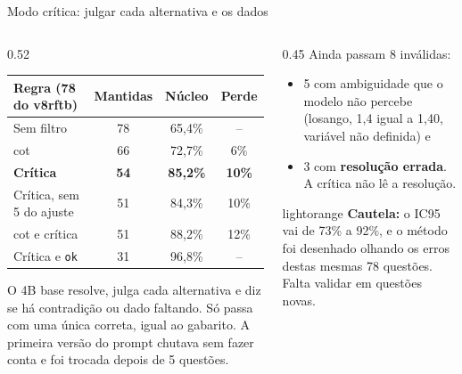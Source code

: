 \documentclass[aspectratio=169,11pt]{beamer}
\begin{document}
\begin{frame}{Modo crítica: julgar cada alternativa e os dados}
  \begin{columns}[T]
    \begin{column}{0.52\textwidth}
      \scriptsize
      \begin{tabular}{@{}lccc@{}}
        \toprule
        Regra (78 do v8rftb) & Mantidas & Núcleo & Perde \\
        \midrule
        Sem filtro & 78 & 65,4\% & -- \\
        cot & 66 & 72,7\% & 6\% \\
        \textbf{Crítica} & \textbf{54} & \textbf{85,2\%} & \textbf{10\%} \\
        Crítica, sem 5 do ajuste & 51 & 84,3\% & 10\% \\
        cot e crítica & 51 & 88,2\% & 12\% \\
        Crítica e \texttt{ok} & 31 & 96,8\% & -- \\
        \bottomrule
      \end{tabular}
      \vspace{4pt}

      \footnotesize
      O 4B base resolve, julga cada alternativa e diz se há contradição ou dado faltando. Só passa com uma única correta, igual ao gabarito.
      A primeira versão do prompt chutava sem fazer conta e foi trocada depois de 5 questões.
    \end{column}
    \begin{column}{0.45\textwidth}
      \small
      Ainda passam 8 inválidas:
      \begin{itemize}\footnotesize
        \item 5 com ambiguidade que o modelo não percebe (losango, 1,4 igual a 1,40, variável não definida) e
        \item 3 com \textbf{resolução errada}. A crítica não lê a resolução.
      \end{itemize}
      \begin{caixa}{lightorange}
        \footnotesize
        \textbf{Cautela:} o IC95 vai de 73\% a 92\%, e o método foi desenhado olhando os erros destas mesmas 78 questões.
        Falta validar em questões novas.
      \end{caixa}
    \end{column}
  \end{columns}
\end{frame}
\end{document}
